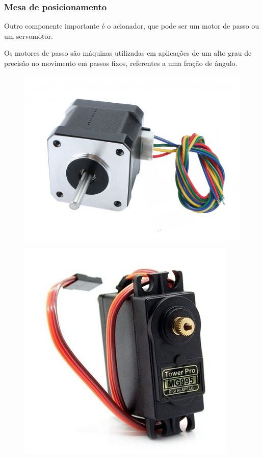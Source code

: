 \begin{frame}
\frametitle{Mesa de posicionamento}

Outro componente importante é o acionador, que pode ser um motor de passo ou um servomotor. 

Os motores de passo são máquinas utilizadas em aplicações de um alto grau de precisão no movimento em passos fixos, referentes a uma fração de ângulo. 

\begin{figure}
\centering
\includegraphics[scale = 0.07]{figs/motordepassoex}
\end{figure}

\begin{figure}
\centering
\includegraphics[scale = 0.13]{figs/servomotorex}
\end{figure}
    
\end{frame}
